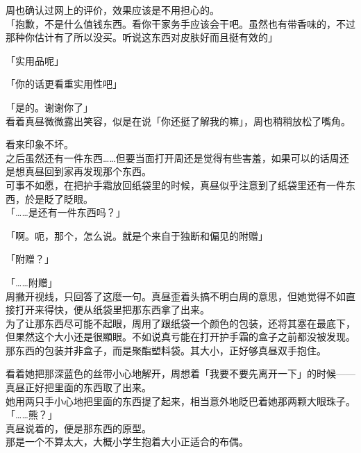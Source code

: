 周也确认过网上的评价，效果应该是不用担心的。\\

「抱歉，不是什么值钱东西。看你干家务手应该会干吧。虽然也有带香味的，不过那种你估计有了所以没买。听说这东西对皮肤好而且挺有效的」

「实用品呢」

「你的话更看重实用性吧」

「是的。谢谢你了」\\%

看着真昼微微露出笑容，似是在说「你还挺了解我的嘛」，周也稍稍放松了嘴角。

看来印象不坏。\\

之后虽然还有一件东西……但要当面打开周还是觉得有些害羞，如果可以的话周还是想真昼回到家再发现那个东西。\\

可事不如愿，在把护手霜放回纸袋里的时候，真昼似乎注意到了纸袋里还有一件东西，於是眨了眨眼。\\

「……是还有一件东西吗？」

「啊。呃，那个，怎么说。就是个来自于独断和偏见的附赠」

「附赠？」

「……附赠」\\

周撇开视线，只回答了这麼一句。真昼歪着头搞不明白周的意思，但她觉得不如直接打开来得快，便从纸袋里把那东西拿了出来。\\

为了让那东西尽可能不起眼，周用了跟纸袋一个颜色的包装，还将其塞在最底下，但果然这个大小还是很顯眼。不如说真亏能在打开护手霜的盒子之前都没被发现。\\

那东西的包装并非盒子，而是聚酯塑料袋。其大小，正好够真昼双手抱住。

看着她把那深蓝色的丝带小心地解开，周想着「我要不要先离开一下」的时候——真昼正好把里面的东西取了出来。\\

她用两只手小心地把里面的东西提了起来，相当意外地眨巴着她那两颗大眼珠子。\\

「……熊？」\\

真昼说着的，便是那东西的原型。\\

那是一个不算太大，大概小学生抱着大小正适合的布偶。

